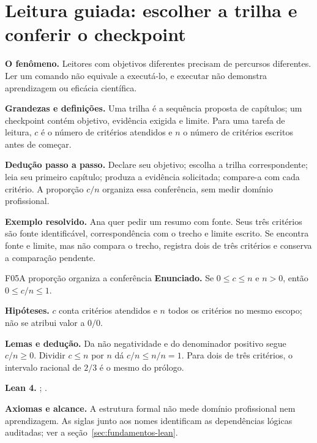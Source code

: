 \section[Leitura guiada]{Leitura guiada: escolher a trilha e conferir o checkpoint}
\begin{descricao}
\textbf{O fenômeno.} Leitores com objetivos diferentes precisam de percursos diferentes. Ler um comando não equivale a executá-lo, e executar não demonstra aprendizagem ou eficácia científica.
\end{descricao}
\begin{definicao}
\textbf{Grandezas e definições.} Uma trilha é a sequência proposta de capítulos; um checkpoint contém objetivo, evidência exigida e limite. Para uma tarefa de leitura, $c$ é o número de critérios atendidos e $n$ o número de critérios escritos antes de começar.
\end{definicao}
\begin{metodo}
\textbf{Dedução passo a passo.} Declare seu objetivo; escolha a trilha correspondente; leia seu primeiro capítulo; produza a evidência solicitada; compare-a com cada critério. A proporção $c/n$ organiza essa conferência, sem medir domínio profissional.
\end{metodo}
\begin{resultado}
\textbf{Exemplo resolvido.} Ana quer pedir um resumo com fonte. Seus três critérios são fonte identificável, correspondência com o trecho e limite escrito. Se encontra fonte e limite, mas não compara o trecho, registra dois de três critérios e conserva a comparação pendente.
\end{resultado}
\begin{formalizacao}{F05}{A proporção organiza a conferência}
\textbf{Enunciado.} Se $0\leq c\leq n$ e $n>0$, então $0\leq c/n\leq1$.

\textbf{Hipóteses.} $c$ conta critérios atendidos e $n$ todos os critérios no mesmo escopo; não se atribui valor a $0/0$.

\textbf{Lemas e dedução.} Da não negatividade e do denominador positivo segue $c/n\geq0$. Dividir $c\leq n$ por $n$ dá $c/n\leq n/n=1$. Para dois de três critérios, o intervalo racional de $2/3$ é o mesmo do prólogo.

\textbf{Lean 4.} ; .

\textbf{Axiomas e alcance.} A estrutura formal não mede domínio profissional nem aprendizagem. As siglas junto aos nomes identificam as dependências lógicas auditadas; ver a seção~\ref{sec:fundamentos-lean}.
\end{formalizacao}

